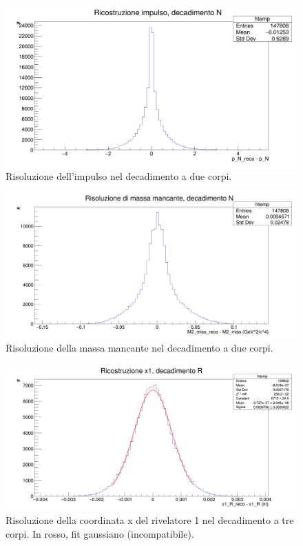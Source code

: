 \documentclass[8pt]{extarticle}
\begin{document}
\begin{figure}[!h]
\begin{center}
\includegraphics[scale=0.25]{reco_p_N}
\caption{Risoluzione dell'impulso nel decadimento a due corpi.}
\label{fig:reco_p_N}
\end{center}
\end{figure}


\begin{figure}[!h]
\begin{center}
\includegraphics[scale=0.25]{reco_miss_N}
\caption{Risoluzione della massa mancante nel decadimento a due corpi.}
\label{fig:reco_miss_N}
\end{center}
\end{figure}


\begin{figure}[!h]
\begin{center}
\includegraphics[scale=0.25]{reco_x1_R}
\caption{Risoluzione della coordinata x del rivelatore 1 nel decadimento a tre corpi. In rosso, fit gaussiano (incompatibile).}
\label{fig:reco_x1_R}
\end{center}
\end{figure}
\end{document}
